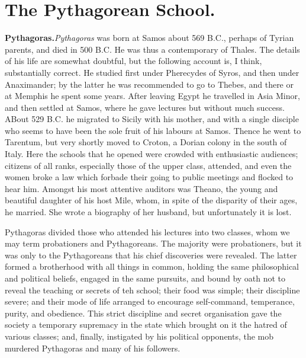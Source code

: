 \documentclass[12pt,oneside]{book}
\begin{document}
\section{The Pythagorean School.}

\textbf{Pythagoras.}\footnotemark \textit{Pythagoras} was born at Samos about 569 B.C., perhaps of Tyrian parents, and died in 500 B.C. He was thus a contemporary of Thales. The details of his life are somewhat doubtful, but the following account is, I think, substantially correct. He studied first under Pherecydes of Syros, and then under Anaximander; by the latter he was recommended to go to Thebes, and there or at Memphis he spent some years. After leaving Egypt he travelled in Asia Minor, and then settled at Samos, where he gave lectures but without much success. ABout 529 B.C. he migrated to Sicily with his mother, and with a single disciple who seems to have been the sole fruit of his labours at Samos. Thence he went to Tarentum, but very shortly moved to Croton, a Dorian colony in the south of Italy. Here the schools that he opened were crowded with enthusiastic audiences; citizens of all ranks, especially those of the upper class, attended, and even the women broke a law which forbade their going to public meetings and flocked to hear him. Amongst his most attentive auditors was Theano, the young and beautiful daughter of his host Mile, whom, in spite of the disparity of their ages, he married. She wrote a biography of her husband, but unfortunately it is lost. \par 


Pythagoras divided those who attended his lectures into two classes, whom we may term probationers and Pythagoreans. The majority were probationers, but it was only to the Pythagoreans that his chief discoveries were revealed. The latter formed a brotherhood with all things in common, holding the same philosophical and political beliefs, engaged in the same pursuits, and bound by oath not to reveal the teaching or secrets of teh school; their food was simple; their discipline severe; and their mode of life arranged to encourage self-command, temperance, purity, and obedience. This strict discipline and secret organisation gave the society a temporary supremacy in the state which brought on it the hatred of various classes; and, finally, instigated by his political opponents, the mob murdered Pythagoras and many of his followers. \par 
\end{document}
